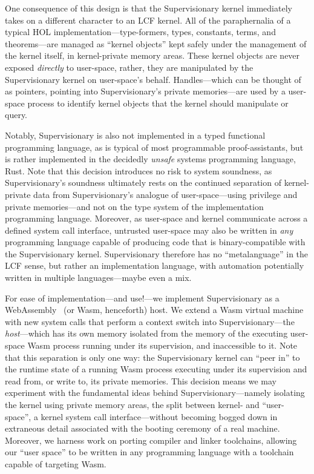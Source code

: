 \documentclass[a4paper, UKenglish, cleveref, autoref, thm-restate, colorlinks]{lipics-v2021}
\begin{document}
One consequence of this design is that the Supervisionary kernel immediately takes on a different character to an LCF kernel.
All of the paraphernalia of a typical HOL implementation---type-formers, types, constants, terms, and theorems---are managed as ``kernel objects'' kept safely under the management of the kernel itself, in kernel-private memory areas.
These kernel objects are never exposed \emph{directly} to user-space, rather, they are manipulated by the Supervisionary kernel on user-space's behalf.
Handles---which can be thought of as pointers, pointing into Supervisionary's private memories---are used by a user-space process to identify kernel objects that the kernel should manipulate or query.

Notably, Supervisionary is also not implemented in a typed functional programming language, as is typical of most programmable proof-assistants, but is rather implemented in the decidedly \emph{unsafe} systems programming language, Rust.
Note that this decision introduces no risk to system soundness, as Supervisionary's soundness ultimately rests on the continued separation of kernel-private data from Supervisionary's analogue of user-space---using privilege and private memories---and not on the type system of the implementation programming language.
Moreover, as user-space and kernel communicate across a defined system call interface, untrusted user-space may also be written in \emph{any} programming language capable of producing code that is binary-compatible with the Supervisionary kernel.
Supervisionary therefore has no ``metalanguage'' in the LCF sense, but rather an implementation language, with automation potentially written in multiple languages---maybe even a mix.

For ease of implementation---and use!---we implement Supervisionary as a WebAssembly~\cite{DBLP:conf/pldi/HaasRSTHGWZB17} (or Wasm, henceforth) host.
We extend a Wasm virtual machine with new system calls that perform a context switch into Supervisionary---the \emph{host}---which has its own memory isolated from the memory of the executing user-space Wasm process running under its supervision, and inaccessible to it.
Note that this separation is only one way: the Supervisionary kernel can ``peer in'' to the runtime state of a running Wasm process executing under its supervision and read from, or write to, its private memories.
This decision means we may experiment with the fundamental ideas behind Supervisionary---namely isolating the kernel using private memory areas, the split between kernel- and ``user-space'', a kernel system call interface---without becoming bogged down in extraneous detail associated with the booting ceremony of a real machine.
Moreover, we harness work on porting compiler and linker toolchains, allowing our ``user space'' to be written in any programming language with a toolchain capable of targeting Wasm.
\end{document}
